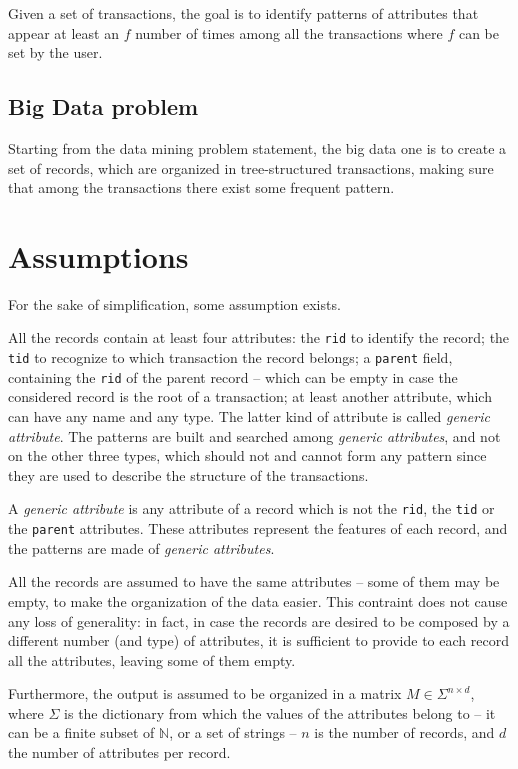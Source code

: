 \documentclass{acm_proc_article-sp-sigmod09}
\begin{document}
Given a set of transactions, the goal is to identify patterns of attributes that appear at least an $f$ number of times among all the transactions where $f$ can be set by the user.

\subsection{Big Data problem}
Starting from the data mining problem statement, the big data one is to create a set of records, which are organized in tree-structured transactions, making sure that among the transactions there exist some frequent pattern.

\section{Assumptions}
\label{sec:assumptions}
For the sake of simplification, some assumption exists.

All the records contain at least four attributes: the \texttt{rid} to identify the record; the \texttt{tid} to recognize to which transaction the record belongs; a \texttt{parent} field, containing the \texttt{rid} of the parent record -- which can be empty in case the considered record is the root of a transaction; at least another attribute, which can have any name and any type. The latter kind of attribute is called \emph{generic attribute}. The patterns are built and searched among \emph{generic attributes}, and not on the other three types, which should not and cannot form any pattern since they are used to describe the structure of the transactions.

\begin{definition}
A \emph{generic attribute} is any attribute of a record which is not the \texttt{rid}, the \texttt{tid} or the \texttt{parent} attributes. These attributes represent the features of each record, and the patterns are made of \emph{generic attributes}.
\end{definition}

All the records are assumed to have the same attributes -- some of them may be empty, to make the organization of the data easier. This contraint does not cause any loss of generality: in fact, in case the records are desired to be composed by a different number (and type) of attributes, it is sufficient to provide to each record all the attributes, leaving some of them empty. 

Furthermore, the output is assumed to be organized in a matrix $M \in \Sigma^{n \times d}$, where $\Sigma$ is the dictionary from which the values of the attributes belong to -- it can be a finite subset of $\mathbb{N}$, or a set of strings -- $n$ is the number of records, and $d$ the number of attributes per record.
\end{document}
